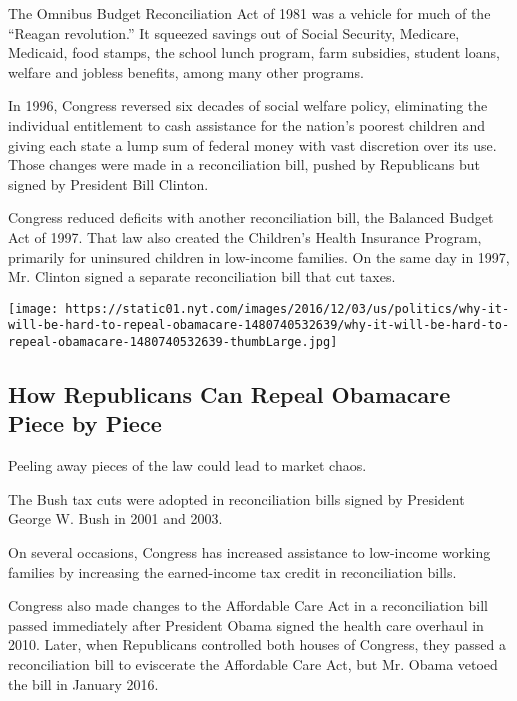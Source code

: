 The Omnibus Budget Reconciliation Act of 1981 was a vehicle for much of
the ``Reagan revolution.'' It squeezed savings out of Social Security,
Medicare, Medicaid, food stamps, the school lunch program, farm
subsidies, student loans, welfare and jobless benefits, among many other
programs.

In 1996, Congress reversed six decades of social welfare policy,
eliminating the individual entitlement to cash assistance for the
nation's poorest children and giving each state a lump sum of federal
money with vast discretion over its use. Those changes were made in a
reconciliation bill, pushed by Republicans but signed by President Bill
Clinton.

Congress reduced deficits with another reconciliation bill, the Balanced
Budget Act of 1997. That law also created the Children's Health
Insurance Program, primarily for uninsured children in low-income
families. On the same day in 1997, Mr. Clinton signed a separate
reconciliation bill that cut taxes.

\href{https://www.nytimes.com/interactive/2016/12/03/us/politics/why-it-will-be-hard-to-repeal-obamacare.html}{}

\texttt{[image: https://static01.nyt.com/images/2016/12/03/us/politics/why-it-will-be-hard-to-repeal-obamacare-1480740532639/why-it-will-be-hard-to-repeal-obamacare-1480740532639-thumbLarge.jpg]}

\hypertarget{how-republicans-can-repeal-obamacare-piece-by-piece}{%
\subsection{How Republicans Can Repeal Obamacare Piece by
Piece}\label{how-republicans-can-repeal-obamacare-piece-by-piece}}

Peeling away pieces of the law could lead to market chaos.

The Bush tax cuts were adopted in reconciliation bills signed by
President George W. Bush in 2001 and 2003.

On several occasions, Congress has increased assistance to low-income
working families by increasing the earned-income tax credit in
reconciliation bills.

Congress also made changes to the Affordable Care Act in a
reconciliation bill passed immediately after President Obama signed the
health care overhaul in 2010. Later, when Republicans controlled both
houses of Congress, they passed a reconciliation bill to eviscerate the
Affordable Care Act, but Mr. Obama vetoed the bill in January 2016.


